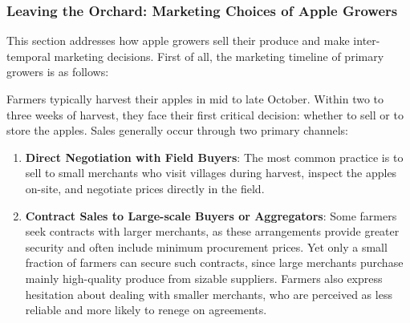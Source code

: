 \subsubsection{Leaving the Orchard: Marketing Choices of Apple Growers}
\noindent This section addresses how apple growers sell their produce and make inter-temporal marketing decisions. First of all, the marketing timeline of primary growers is as follows: 



Farmers typically harvest their apples in mid to late October. Within two to three weeks of harvest, they face their first critical decision: whether to sell or to store the apples. Sales generally occur through two primary channels:

\begin{enumerate}
    \item \textbf{Direct Negotiation with Field Buyers}: The most common practice is to sell to small merchants who visit villages during harvest, inspect the apples on-site, and negotiate prices directly in the field.
    \item \textbf{Contract Sales to Large-scale Buyers or Aggregators}: Some farmers seek contracts with larger merchants, as these arrangements provide greater security and often include minimum procurement prices. Yet only a small fraction of farmers can secure such contracts, since large merchants purchase mainly high-quality produce from sizable suppliers. Farmers also express hesitation about dealing with smaller merchants, who are perceived as less reliable and more likely to renege on agreements.
\end{enumerate}

